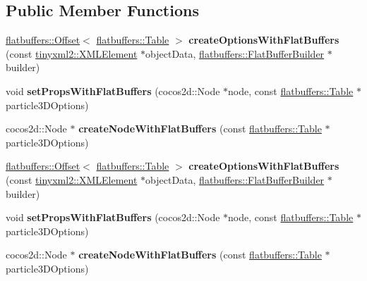 \subsection*{Public Member Functions}
\begin{DoxyCompactItemize}
\item 
\mbox{\label{classcocostudio_1_1Particle3DReader_ac086547d38a1e761cd9b268e571afe52}} 
\hyperlink{structflatbuffers_1_1Offset}{flatbuffers\+::\+Offset}$<$ \hyperlink{classflatbuffers_1_1Table}{flatbuffers\+::\+Table} $>$ {\bfseries create\+Options\+With\+Flat\+Buffers} (const \hyperlink{classtinyxml2_1_1XMLElement}{tinyxml2\+::\+X\+M\+L\+Element} $\ast$object\+Data, \hyperlink{classflatbuffers_1_1FlatBufferBuilder}{flatbuffers\+::\+Flat\+Buffer\+Builder} $\ast$builder)
\item 
\mbox{\label{classcocostudio_1_1Particle3DReader_ad0db46152997df17acd1eeca5c070d3c}} 
void {\bfseries set\+Props\+With\+Flat\+Buffers} (cocos2d\+::\+Node $\ast$node, const \hyperlink{classflatbuffers_1_1Table}{flatbuffers\+::\+Table} $\ast$particle3\+D\+Options)
\item 
\mbox{\label{classcocostudio_1_1Particle3DReader_af0dd99f9d37c56013fbb518a866fc312}} 
cocos2d\+::\+Node $\ast$ {\bfseries create\+Node\+With\+Flat\+Buffers} (const \hyperlink{classflatbuffers_1_1Table}{flatbuffers\+::\+Table} $\ast$particle3\+D\+Options)
\item 
\mbox{\label{classcocostudio_1_1Particle3DReader_ad115184de1118dc6aa646098fb1b30e6}} 
\hyperlink{structflatbuffers_1_1Offset}{flatbuffers\+::\+Offset}$<$ \hyperlink{classflatbuffers_1_1Table}{flatbuffers\+::\+Table} $>$ {\bfseries create\+Options\+With\+Flat\+Buffers} (const \hyperlink{classtinyxml2_1_1XMLElement}{tinyxml2\+::\+X\+M\+L\+Element} $\ast$object\+Data, \hyperlink{classflatbuffers_1_1FlatBufferBuilder}{flatbuffers\+::\+Flat\+Buffer\+Builder} $\ast$builder)
\item 
\mbox{\label{classcocostudio_1_1Particle3DReader_ad0db46152997df17acd1eeca5c070d3c}} 
void {\bfseries set\+Props\+With\+Flat\+Buffers} (cocos2d\+::\+Node $\ast$node, const \hyperlink{classflatbuffers_1_1Table}{flatbuffers\+::\+Table} $\ast$particle3\+D\+Options)
\item 
\mbox{\label{classcocostudio_1_1Particle3DReader_a5e657a78a20a8d0aa32bd564aa93c363}} 
cocos2d\+::\+Node $\ast$ {\bfseries create\+Node\+With\+Flat\+Buffers} (const \hyperlink{classflatbuffers_1_1Table}{flatbuffers\+::\+Table} $\ast$particle3\+D\+Options)
\end{DoxyCompactItemize}
